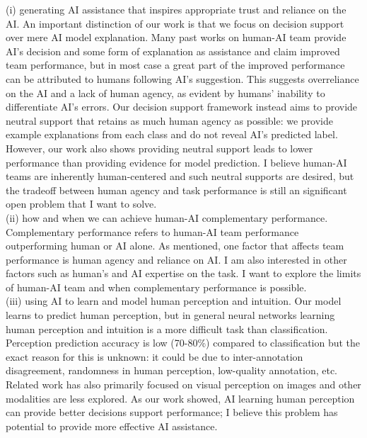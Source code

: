 (i) generating AI assistance that inspires appropriate trust and reliance on the AI. An important distinction of our work is that we focus on decision support over mere AI model explanation. Many past works on human-AI team provide AI's decision and some form of explanation as assistance and claim improved team performance, but in most case a great part of the improved performance can be attributed to humans following AI's suggestion. This suggests overreliance on the AI and a lack of human agency, as evident by humans' inability to differentiate AI's errors. Our decision support framework instead aims to provide neutral support that retains as much human agency as possible: we provide example explanations from each class and do not reveal AI's predicted label. However, our work also shows providing neutral support leads to lower performance than providing evidence for model prediction. I believe human-AI teams are inherently human-centered and such neutral supports are desired, but the tradeoff between human agency and task performance is still an significant open problem that I want to solve. \\

(ii) how and when we can achieve human-AI complementary performance. Complementary performance refers to human-AI team performance outperforming human or AI alone. As mentioned, one factor that affects team performance is human agency and reliance on AI. I am also interested in other factors such as human's and AI expertise on the task. I want to explore the limits of human-AI team and when complementary performance is possible.\\

(iii) using AI to learn and model human perception and intuition. Our model learns to predict human perception, but in general neural networks learning human perception and intuition is a more difficult task than classification. Perception prediction accuracy is low (70-80\%) compared to classification but the exact reason for this is unknown: it could be due to inter-annotation disagreement, randomness in human perception, low-quality annotation, etc. Related work has also primarily focused on visual perception on images and other modalities are less explored. As our work showed, AI learning human perception can provide better decisions support performance; I believe this problem has potential to provide more effective AI assistance.

